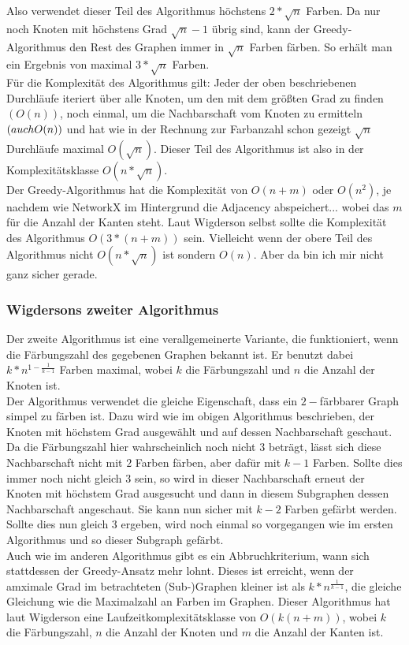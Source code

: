 \documentclass[11pt]{article}
\begin{document}
Also verwendet dieser Teil des Algorithmus höchstens $2*\sqrt{n}$ Farben. Da nur noch Knoten mit höchstens Grad $\sqrt{n}-1$ übrig sind, kann der Greedy-Algorithmus
den Rest des Graphen immer in $\sqrt{n}$ Farben färben. So erhält man ein Ergebnis von maximal $3*\sqrt{n}$ Farben. \\
Für die Komplexität des Algorithmus gilt: Jeder der oben beschriebenen Durchläufe iteriert über alle Knoten, um den mit dem größten Grad zu finden $(O(n))$,
noch einmal, um die Nachbarschaft vom Knoten zu ermitteln $(auch \space O(n))$ %
und hat wie in der Rechnung zur Farbanzahl schon gezeigt $\sqrt{n}$ Durchläufe maximal $O(\sqrt{n})$.
Dieser Teil des Algorithmus ist also in der Komplexitätsklasse $O(n*\sqrt{n})$. \\
Der Greedy-Algorithmus hat die Komplexität von $O(n+m)$ oder $O(n^2)$, je nachdem wie NetworkX im Hintergrund die Adjacency abspeichert... %
wobei das $m$ für die Anzahl der Kanten steht. Laut Wigderson selbst sollte die Komplexität des Algorithmus $O(3*(n+m))$ sein. Vielleicht wenn der obere Teil des Algorithmus nicht $O(n*\sqrt{n})$ ist sondern $O(n)$. Aber da bin ich mir nicht ganz sicher gerade.

\subsubsection{Wigdersons zweiter Algorithmus}

Der zweite Algorithmus ist eine verallgemeinerte Variante, die funktioniert, wenn die Färbungszahl des gegebenen Graphen bekannt ist.
Er benutzt dabei $k*n^{1-\frac{1}{k-1}}$ Farben maximal, wobei $k$ die Färbungszahl und $n$ die Anzahl der Knoten ist. \\
Der Algorithmus verwendet die gleiche Eigenschaft, dass ein $2-$färbbarer Graph simpel zu färben ist.
Dazu wird wie im obigen Algorithmus beschrieben, der Knoten mit höchstem Grad ausgewählt und auf dessen Nachbarschaft geschaut. Da die Färbungszahl hier wahrscheinlich noch nicht $3$ beträgt, lässt sich diese Nachbarschaft nicht mit $2$ Farben färben, aber dafür mit $k-1$ Farben. Sollte dies immer noch nicht gleich $3$ sein, so wird in dieser Nachbarschaft erneut der Knoten mit höchstem Grad ausgesucht und dann in diesem Subgraphen dessen Nachbarschaft angeschaut. Sie kann nun sicher mit $k-2$ Farben gefärbt werden. Sollte dies nun gleich $3$ ergeben, wird noch einmal so vorgegangen wie im ersten Algorithmus und so dieser Subgraph gefärbt. \\
Auch wie im anderen Algorithmus gibt es ein Abbruchkriterium, wann sich stattdessen der Greedy-Ansatz mehr lohnt. Dieses ist erreicht, wenn der amximale Grad im betrachteten (Sub-)Graphen kleiner ist als $k*n^{\frac{1}{k-1}}$, die gleiche Gleichung wie die Maximalzahl an Farben im Graphen.
Dieser Algorithmus hat laut Wigderson eine Laufzeitkomplexitätsklasse von $O(k(n+m))$, wobei $k$ die Färbungszahl, $n$ die Anzahl der Knoten und $m$ die Anzahl der Kanten ist.
\end{document}
